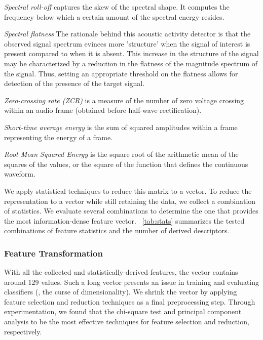 \item \textit{Spectral roll-off} captures the skew of the spectral shape. It
computes the frequency below which a certain amount of the spectral energy
resides.

\item \textit{Spectral flatness} The rationale behind this acoustic activity
detector is that the observed signal spectrum evinces more 'structure' when the
signal of interest is present compared to when it is absent.
%
This increase in the structure of the signal may be characterized by a 
reduction in the flatness of the magnitude spectrum of the signal.
%
Thus, setting an appropriate threshold on the flatness allows for detection of
the presence of the target signal.

\item \textit{Zero-crossing rate (ZCR)} is a measure of the number of zero
voltage crossing within an audio frame (obtained before half-wave
rectification).

\item \textit{Short-time average energy} is the sum of squared amplitudes 
within a frame representing the energy of a frame.

\item \textit{Root Mean Squared Energy} is the square root of the arithmetic
mean of the squares of the values, or the square of the function that defines the
continuous waveform.

\squishend

We apply statistical techniques to reduce this matrix to a vector. 
%
To reduce the representation to a vector while still retaining the data, we
collect a combination of statistics. 
%
We evaluate several combinations to determine the one that provides the most
information-dense feature vector. 
%
~\cref{tab:stats} summarizes the tested combinations of feature statistics 
and the number of derived descriptors.
%

\subsubsection{Feature Transformation}
\label{sec:representation::transform}

With all the collected and statistically-derived features, the vector contains
around 129 values.
%
Such a long vector presents an issue in training and evaluating classifiers
(\ie, the curse of dimensionality).
%
We shrink the vector by applying feature selection and reduction techniques as 
a final preprocessing step.
%
Through experimentation, we found that the chi-square test and principal
component analysis to be the most effective techniques for feature selection and
reduction, respectively.

